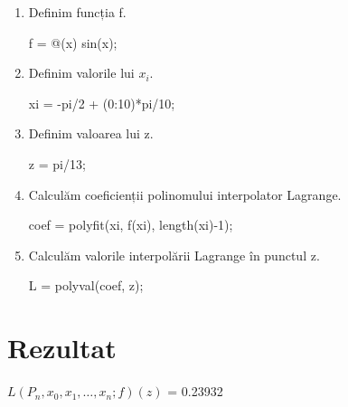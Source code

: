 \documentclass{article}
\begin{document}
\begin{center}
\begin{enumerate}
\item Definim funcția f.\\
 \begin{center}
    f = @(x) sin(x);
    \end{center}
\item  Definim valorile lui $x_i$. \\
\begin{center}
    xi = -pi/2 + (0:10)*pi/10;
\end{center}
\item Definim valoarea lui z. \\
 \begin{center}
    z = pi/13;
 \end{center}
\item Calculăm coeficienții polinomului interpolator Lagrange. \\
 \begin{center}
    coef = polyfit(xi, f(xi), length(xi)-1);
 \end{center}
 \item Calculăm valorile interpolării Lagrange în punctul z. \\
 \begin{center}
    L = polyval(coef, z);
 \end{center}
\end{enumerate}
\end{center}

\section*{Rezultat}
\begin{center}
   $L(P_n, x_0, x_1, \ldots, x_n; f)(z)$ = 0.23932
\end{center}
\end{document}
